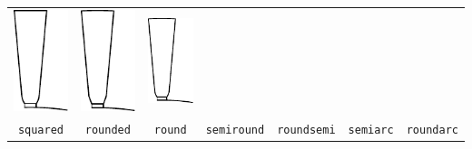 \documentclass[a4paper,11pt,oneside,fleqn]{report}
\begin{document}
{\begin{tabular}{ccccccc}
\includegraphics{../examples/slots/roundsemi_slot} &
\includegraphics{../examples/slots/semiarc_slot} &
\includegraphics{../examples/slots/roundarc_slot} \\
%
\texttt{squared} &
\texttt{rounded} &
\texttt{round} &
\texttt{semiround} &
\texttt{roundsemi} &
\texttt{semiarc} & 
\texttt{roundarc}
\end{tabular}}
\vspace{1cm}


\newpage
\end{document}
